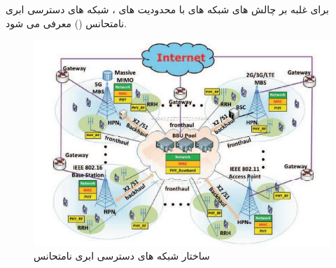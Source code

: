 \begin{itemize}
برای غلبه بر چالش های شبکه های  با محدودیت های  ، شبکه های دسترسی ابری نامتحانس () معرفی می شود\cite{ fogComputing, heterogeneous, fogEdge}.
\begin{figure}
  \centering
    \includegraphics[scale = 0.8]{./fig/hc}
  \caption{ ساختار شبکه های دسترسی ابری نامتحانس \cite{heterogeneous}  }
  \label{fig:hc}
\end{figure}


\end{itemize}
